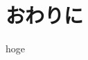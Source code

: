\documentclass[11pt]{jreport}
\begin{document}
\chapter{おわりに}\label{sec:fig-tab-exp}
hoge










% 
% 
% 

\end{document}
